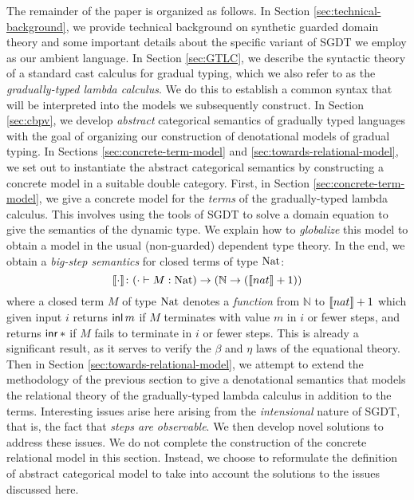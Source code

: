 
The remainder of the paper is organized as follows. In Section
\ref{sec:technical-background}, we provide technical background on synthetic
guarded domain theory and some important details about the specific variant of
SGDT we employ as our ambient language.
%
In Section \ref{sec:GTLC}, we describe the syntactic theory of a standard cast
calculus for gradual typing, which we also refer to as the \emph{gradually-typed
lambda calculus}. We do this to establish a common syntax that will be
interpreted into the models we subsequently construct.
%
In Section \ref{sec:cbpv}, we develop \emph{abstract} categorical
semantics of gradually typed languages with the goal of organizing our
construction of denotational models of gradual typing.
%
In Sections \ref{sec:concrete-term-model} and
\ref{sec:towards-relational-model}, we set out to instantiate the abstract
categorical semantics by constructing a concrete model in a suitable double
category. First, in Section \ref{sec:concrete-term-model}, we give a concrete
model for the \emph{terms} of the gradually-typed lambda calculus. This involves
using the tools of SGDT to solve a domain equation to give the semantics of the
dynamic type. We explain how to \emph{globalize} this model to obtain a model in
the usual (non-guarded) dependent type theory. In the end, we obtain a
\emph{big-step semantics} for closed terms of type $\text{Nat}$:
%
\[ \llbracket {\cdot} \rrbracket \colon (\cdot \vdash M : \text{Nat}) \to (\mathbb{N} \to (\llbracket {nat} \rrbracket + 1)) \] 
%
where a closed term $M$ of type $\text{Nat}$ denotes a \emph{function} from
$\mathbb{N}$ to $\llbracket {nat} \rrbracket + 1$ which given input $i$ returns $\mathsf{inl}\, m$ if $M$
terminates with value $m$ in $i$ or fewer steps, and returns $\mathsf{inr}\, *$ if $M$
fails to terminate in $i$ or fewer steps. This is already a significant result,
as it serves to verify the $\beta$ and $\eta$ laws of the equational theory.
%
Then in Section \ref{sec:towards-relational-model}, we attempt to extend the
methodology of the previous section to give a denotational semantics that models
the relational theory of the gradually-typed lambda calculus in addition to the
terms. Interesting issues arise here arising from the \emph{intensional} nature
of SGDT, that is, the fact that \emph{steps are observable}. We then develop
novel solutions to address these issues. We do not complete the construction of
the concrete relational model in this section. Instead, we choose to reformulate
the definition of abstract categorical model to take into account the solutions
to the issues discussed here.

